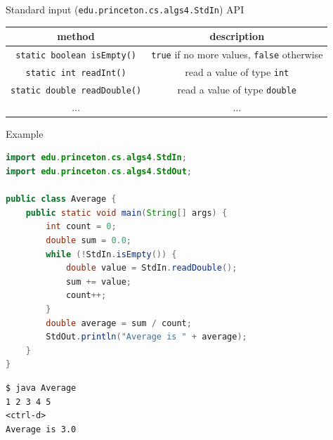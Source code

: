 \documentclass[8pt,a4paper,compress]{beamer}
\begin{document}
\begin{frame}[fragile]
\pause

Standard input (\lstinline{edu.princeton.cs.algs4.StdIn}) API
\begin{center}
\begin{tabular}{cc}
method & description \\ \hline
\lstinline$static boolean isEmpty()$ & \lstinline$true$ if no more values, \lstinline$false$ otherwise \\
\lstinline$static int readInt()$ & read a value of type \lstinline$int$ \\
\lstinline$static double readDouble()$ & read a value of type \lstinline$double$ \\
$\dots$ & $\dots$ 
\end{tabular} 
\end{center}

\pause\bigskip

Example

\smallskip

\begin{lstlisting}[language=Java,style=focusin]
import edu.princeton.cs.algs4.StdIn;
import edu.princeton.cs.algs4.StdOut;

public class Average { 
    public static void main(String[] args) { 
        int count = 0; 
        double sum = 0.0;
        while (!StdIn.isEmpty()) {
            double value = StdIn.readDouble();
            sum += value;
            count++;
        }
        double average = sum / count;
        StdOut.println("Average is " + average);
    }
}
\end{lstlisting}

\pause\bigskip

\begin{lstlisting}[language={}]
$ java Average
1 2 3 4 5
<ctrl-d>
Average is 3.0
\end{lstlisting}
\end{frame}
\end{document}
